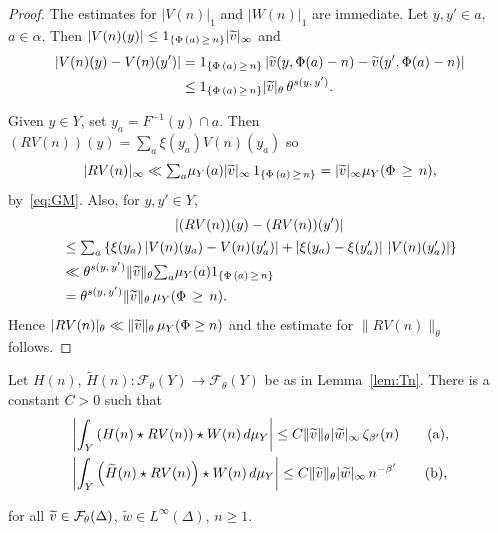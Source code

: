 \documentclass[10pt]{amsart}
\theoremstyle{definition}\newtheorem{defi}[theo]{Definition}\newtheorem{rema}[theo]{Remark}\newtheorem{exam}[theo]{Example}\newtheorem{exem}[theo]{Example}\newtheorem{nota}[theo]{Notation}
\newcommand{\cF}{\mathcal{F}}
\newcommand{\suma}{\textstyle{\sum_a}}
\newcommand{\tw}{\widetilde{w}}
\newcommand{\tv}{\tilde{v}}
\newcommand{\tH}{\widetilde{H}}
\newcommand*{\alphenumi}{\renewcommand*{\theenumi}{\alph{enumi}}}
\let\oldtilde\tilde
\renewcommand*{\tilde}[1]{\mathchoice{\widetilde{#1}}{\widetilde{#1}}{\oldtilde{#1}}{\oldtilde{#1}}}
\begin{document}
\begin{proof}
The estimates for $|V(n)|_1$ and $|W(n)|_1$ are immediate. Let $y,y'\in a$, $a\in\alpha$. Then $|V(n)(y)|
\le 1_{\left\{\Phi\,(a)\,\ge\,n\right\}}|\tv|_\infty$ and
\begin{align*}
\left|V(n)(y)-V(n)(y')\right| & = 1_{\left\{\Phi\,(a)\,\ge\,n\right\}} \left|\tv(y,\Phi(a)-n)-\tv(y',\Phi(a)-n)\right|\\
& \le 1_{\left\{\Phi\,(a)\,\ge\,n\right\}}|\tv|_\theta\,\theta^{s(y,\,y')}.
\end{align*}

Given $y\in Y$, set $y_a=F^{-1}(y)\cap a$. Then $(RV(n))(y)=\suma \xi(y_a)V(n)(y_a)$ so
\[
|RV(n)|_\infty\ll
\suma \mu_Y(a)|\tv|_\infty\, 1_{\left\{\Phi\,(a)\,\ge\,n\right\}} =|\tv|_\infty\mu_Y(\Phi\,\ge\, n),
\]
by~\eqref{eq:GM}. Also, for $y,y'\in Y$,
\begin{multline*}
\left|(RV(n))(y)- (RV(n))(y')\right|
\\ 
\begin{aligned}
& \le\suma \left\{\xi(y_a)\left|V(n)(y_a)-V(n)(y'_a)\right| +\left|\xi(y_a)-\xi(y'_a)\right|\,\left|V(n)(y'_a)\right|\right\}\\
& \ll \theta^{s(y,\,y')}\|\tv\|_\theta \suma\mu_Y(a)1_{\left\{\Phi\,(a)\,\ge\,n\right\}}\\
&= \theta^{s(y,\,y')}\|\tv\|_\theta\, \mu_Y(\Phi\,\ge\,n).
\end{aligned}
\end{multline*}
Hence $|RV(n)|_\theta\ll \|\tv\|_\theta\, \mu_Y(\Phi\ge n)$ and the estimate for $\|RV(n)\|_\theta$ follows.
\end{proof}

\begin{coro} \label{cor:Hn}
Let $H(n),\,\tH(n):\cF_\theta(Y)\to\cF_\theta(Y)$ be as in Lemma~\ref{lem:Tn}. There is a constant $C>0$ such that
\begin{align}
&\left|\int_Y\left(H(n)\star RV(n)\right)\star W(n)\,d\mu_Y\right| \le C \|\tv\|_\theta |\tw|_\infty\, \zeta_{\beta'}(n)\tag{${\rm a}$}\label{coro4.6.1},\\
&\left|\int_Y\left(\tH(n)\star RV(n)\right)\star W(n)\,d\mu_Y\right| \le C \|\tv\|_\theta |\tw|_\infty\, n^{-\beta'}\tag{${\rm b}$}\label{coro4.6.2},
\end{align}

for all $\tv\in\cF_\theta(\Delta)$, $\tw\in L^\infty(\Delta)$, $n\ge1$.
\end{coro}
\end{document}
